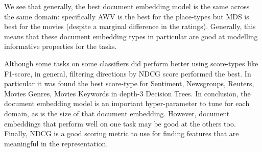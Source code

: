  We see that generally, the best document embedding model is the same across the same domain: specifically AWV is the best for the place-types but MDS is best for the movies (despite a marginal difference in the ratings). Generally, this  means that these document embedding types in particular are good at modelling informative properties for the tasks. 
 
 Although some tasks on some classifiers did perform better using score-types like F1-score, in general, filtering directions by NDCG score performed the best. In particular it was found  the best score-type for Sentiment, Newsgroups, Reuters, Movies Genres, Movies Keywords in depth-3 Decision Trees.  In conclusion, the document embedding model is an important hyper-parameter to tune for each domain, as is the size of that document embedding. However, document embeddings that perform well on one task may be good at the others too. Finally, NDCG is a good scoring metric to use for finding features that are meaningful in the representation.
 



